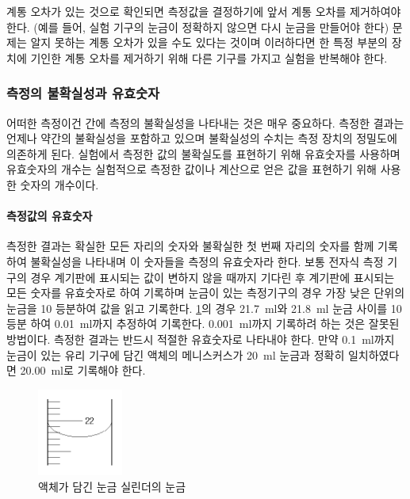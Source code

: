 \documentclass{GSHS-chemexp}
\begin{document}
	계통 오차가 있는 것으로 확인되면 측정값을 결정하기에 앞서
	계통 오차를 제거하여야 한다.
	(예를 들어, 실험 기구의 눈금이 정확하지 않으면
	다시 눈금을 만들어야 한다)
	문제는 알지 못하는 계통 오차가 있을 수도 있다는 것이며
	이러하다면 한 특정 부분의 장치에 기인한 계통 오차를
	제거하기 위해 다른 기구를 가지고 실험을 반복해야 한다.
	
	\subsubsection{측정의 불확실성과 유효숫자}
	어떠한 측정이건 간에 측정의 불확실성을 나타내는 것은 매우 중요하다.
	측정한 결과는 언제나 약간의 불확실성을 포함하고 있으며
	불확실성의 수치는 측정 장치의 정밀도에 의존하게 된다.
	실험에서 측정한 값의 불확실도를 표현하기 위해 유효숫자를 사용하며
	유효숫자의 개수는 실험적으로 측정한 값이나 계산으로 얻은 값을
	표현하기 위해 사용한 숫자의 개수이다.
		
	\paragraph{측정값의 유효숫자}
	측정한 결과는 확실한 모든 자리의 숫자와
	불확실한 첫 번째 자리의 숫자를 함께 기록하여
	불확실성을 나타내며 이 숫자들을 측정의 유효숫자라 한다.
	보통 전자식 측정 기구의 경우 계기판에 표시되는 값이
	변하지 않을 때까지 기다린 후 계기판에 표시되는 모든 숫자를
	유효숫자로 하여 기록하며 눈금이 있는 측정기구의 경우
	가장 낮은 단위의 눈금을 10 등분하여 값을 읽고 기록한다.
	\ref{fig:gradation}의 경우 \SI{21.7}{\milli\litre}와
	\SI{21.8}{\milli\litre} 눈금 사이를
	10 등분 하여 \SI{0.01}{\milli\litre}까지 추정하여 기록한다.
	\SI{0.001}{\milli\litre}까지 기록하려 하는 것은
	잘못된 방법이다.
	측정한 결과는 반드시 적절한 유효숫자로 나타내야 한다.
	만약 \SI{0.1}{\milli\litre}까지 눈금이 있는 유리 기구에
	담긴 액체의 메니스커스가 \SI{20}{\milli\litre} 눈금과
	정확히 일치하였다면 \SI{20.00}{\milli\litre}로 기록해야 한다.
	\begin{figure}[H]
		\centering
		\includegraphics[width=0.25\textwidth]{Gradation.png}
		\caption{액체가 담긴 눈금 실린더의 눈금}
		\label{fig:gradation}
	\end{figure}
		
\end{document}
